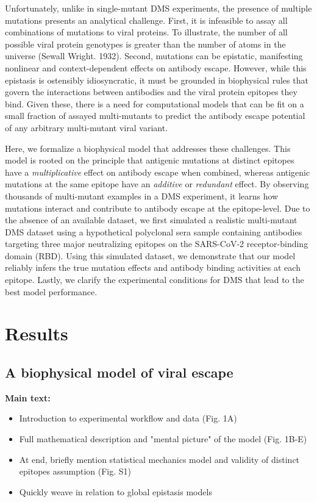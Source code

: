 \documentclass{article}
\begin{document}
Unfortunately, unlike in single-mutant DMS experiments, the presence of multiple mutations presents an analytical challenge.
First, it is infeasible to assay all combinations of mutations to viral proteins.
To illustrate, the number of all possible viral protein genotypes is greater than the number of atoms in the universe (Sewall Wright. 1932).
Second, mutations can be epistatic, manifesting nonlinear and context-dependent effects on antibody escape.
However, while this epistasis is ostensibly idiosyncratic, it must be grounded in biophysical rules that govern the interactions between antibodies and the viral protein epitopes they bind.
Given these, there is a need for computational models that can be fit on a small fraction of assayed multi-mutants to predict the antibody escape potential of any arbitrary multi-mutant viral variant.

Here, we formalize a biophysical model that addresses these challenges.
This model is rooted on the principle that antigenic mutations at distinct epitopes have a \textit{multiplicative} effect on antibody escape when combined, whereas antigenic mutations at the same epitope have an \textit{additive} or \textit{redundant} effect.
By observing thousands of multi-mutant examples in a DMS experiment, it learns how mutations interact and contribute to antibody escape at the epitope-level.
Due to the absence of an available dataset, we first simulated a realistic multi-mutant DMS dataset using a hypothetical polyclonal sera sample containing antibodies targeting three major neutralizing epitopes on the SARS-CoV-2 receptor-binding domain (RBD).
Using this simulated dataset, we demonstrate that our model reliably infers the true mutation effects and antibody binding activities at each epitope.
Lastly, we clarify the experimental conditions for DMS that lead to the best model performance.

\section*{Results}

\subsection*{A biophysical model of viral escape}

\textbf{Main text:}
\begin{itemize}
	\item Introduction to experimental workflow and data (Fig. 1A)
	\item Full mathematical description and "mental picture" of the model (Fig. 1B-E)
	\item At end, briefly mention statistical mechanics model and validity of distinct epitopes assumption (Fig. S1)
	\item Quickly weave in relation to global epistasis models
\end{itemize}
\end{document}

